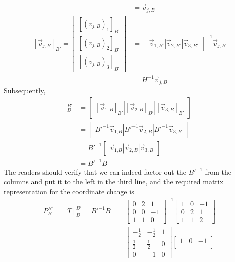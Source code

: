 \begin{solution}
\begin{align*}
&=
\vec{v}_{j,B} \\
[\vec{v}_{j,B}]_{B'} =
\begin{bmatrix}
[(v_{j,B})_1]_{B'} \\
[(v_{j,B})_2]_{B'} \\
[(v_{j,B})_3]_{B'}
\end{bmatrix}
&=
\begin{bmatrix}
\vec{v}_{1,B'} | \vec{v}_{2,B'} | \vec{v}_{3,B'}
\end{bmatrix}^{-1}
\vec{v}_{j,B} \\
&= H^{-1}\vec{v}_{j,B}
\end{align*} 
Subsequently,
\begin{align*}
[T]_B^{B'} &= \begin{bmatrix}
[\vec{v}_{1,B}]_{B'} | [\vec{v}_{2,B}]_{B'} | [\vec{v}_{3,B}]_{B'}
\end{bmatrix} \\
&= \begin{bmatrix}
B'^{-1}\vec{v}_{1,B} | B'^{-1}\vec{v}_{2,B} | B'^{-1}\vec{v}_{3,B} 
\end{bmatrix} \\
&= B'^{-1}\begin{bmatrix}
\vec{v}_{1,B} | \vec{v}_{2,B} | \vec{v}_{3,B} 
\end{bmatrix} \\
&= B'^{-1}B
\end{align*}
The readers should verify that we can indeed factor out the $B'^{-1}$ from the columns and put it to the left in the third line, and the required matrix representation for the coordinate change is
\begin{align*}
P_B^{B'} = [T]_B^{B'} = B'^{-1}B &= 
\begin{bmatrix}
0 & 2 & 1 \\
0 & 0 & -1 \\
1 & 1 & 0
\end{bmatrix}^{-1}
\begin{bmatrix}
1 & 0 & -1\\
0 & 2 & 1 \\
1 & 1 & 2
\end{bmatrix} \\
&=
\begin{bmatrix}
-\frac{1}{2} & -\frac{1}{2} & 1 \\
\frac{1}{2} & \frac{1}{2} & 0 \\
0 & -1 & 0
\end{bmatrix}
\begin{bmatrix}
1 & 0 & -1\\

\end{bmatrix}
\end{align*}
\end{solution}
